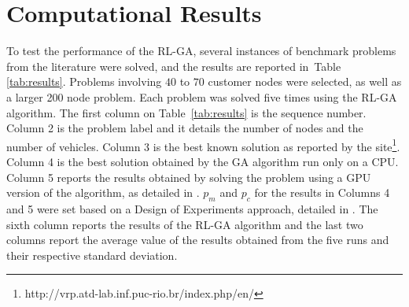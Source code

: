 \documentclass[acmsmall]{acmart}
\begin{document}
\section{Computational Results}\label{sec:exectution-results}
To test the performance of the RL-GA, several instances of benchmark problems from the literature were solved, and the results are reported in~Table \ref{tab:results}. Problems involving $40$ to $70$ customer nodes were selected, as well as a larger 200 node problem. Each problem was solved five times using the RL-GA algorithm. The first column on Table~\ref{tab:results} is the sequence number. Column 2 is the problem label and it details the number of nodes and the number of vehicles. Column 3 is the best known solution as reported by the site\footnote{http://vrp.atd-lab.inf.puc-rio.br/index.php/en/}.  Column 4 is the best solution obtained by the GA algorithm run only on a CPU. Column 5 reports the results obtained by solving the problem using a GPU version of the algorithm, as detailed in \cite{abdelatti2020improved}. $p_m$ and $p_c$ for the results in Columns 4 and 5 were set based on a Design of Experiments approach, detailed in \cite{abdelatti2021Op}. The sixth column reports the results of the RL-GA algorithm and the last two columns report the average value of the results  obtained from the five runs and their respective standard deviation.
\end{document}
